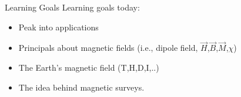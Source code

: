     \begin{frame}
      \begin{PointSix}{Learning Goals}
        \alert{Learning goals today:}
        \begin{itemize}
          \item Peak into applications
          \item Principals about magnetic fields (i.e., dipole field, $\vec{H}$,$\vec{B}$,$\vec{M}$,$\chi$)
          \item The Earth's magnetic field (T,H,D,I,..)
          \item The idea behind magnetic surveys.
        \end{itemize}
      \end{PointSix}
  \end{frame}